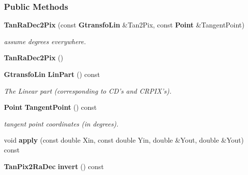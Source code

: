 \subsubsection*{Public Methods}
\begin{CompactItemize}
\item 
{}
{\bf Tan\-Ra\-Dec2Pix} (const {\bf Gtransfo\-Lin} \&Tan2Pix, const {\bf Point} \&Tangent\-Point)\label{class_tanradec2pix_a0}

\begin{CompactList}\small\item\em assume degrees everywhere.\item\end{CompactList}\item 
{}
{\bf Tan\-Ra\-Dec2Pix} ()\label{class_tanradec2pix_a1}

\item 
{}
{\bf Gtransfo\-Lin} {\bf Lin\-Part} () const\label{class_tanradec2pix_a2}

\begin{CompactList}\small\item\em The Linear part (corresponding to CD's and CRPIX's).\item\end{CompactList}\item 
{}
{\bf Point} {\bf Tangent\-Point} () const\label{class_tanradec2pix_a3}

\begin{CompactList}\small\item\em tangent point coordinates (in degrees).\item\end{CompactList}\item 
{}
void {\bf apply} (const double Xin, const double Yin, double \&Yout, double \&Yout) const\label{class_tanradec2pix_a4}

\item 
{}
{\bf Tan\-Pix2Ra\-Dec} {\bf invert} () const\label{class_tanradec2pix_a5}


\end{CompactItemize}
